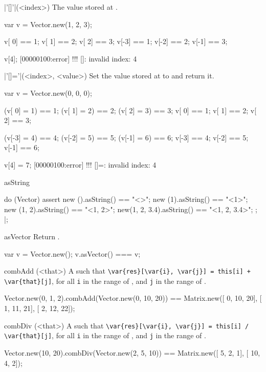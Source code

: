 \begin{urbiscriptapi}
\item|'[]'|(<index>)%
  The value stored at .
\begin{urbiassert}
var v = Vector.new(1, 2, 3);

v[ 0] == 1; v[ 1] == 2; v[ 2] == 3;
v[-3] == 1; v[-2] == 2; v[-1] == 3;

v[4];
[00000100:error] !!! []: invalid index: 4
\end{urbiassert}


\item|'[]='|(<index>, <value>)%
  Set the value stored at  to  and return it.
\begin{urbiassert}
var v = Vector.new(0, 0, 0);

(v[ 0] = 1) == 1; (v[ 1] = 2) == 2; (v[ 2] = 3) == 3;
 v[ 0]      == 1;  v[ 1]      == 2;  v[ 2]      == 3;

(v[-3] = 4) == 4; (v[-2] = 5) == 5; (v[-1] = 6) == 6;
 v[-3]      == 4;  v[-2]      == 5;  v[-1]      == 6;

v[4] = 7;
[00000100:error] !!! []=: invalid index: 4
\end{urbiassert}


\item[asString]%
\begin{urbiscript}
do (Vector)
{
  assert
  {
    new         ().asString() == "<>";
    new        (1).asString() == "<1>";
    new     (1, 2).asString() == "<1, 2>";
    new(1, 2, 3.4).asString() == "<1, 2, 3.4>";
  };
}|;
\end{urbiscript}


\item[asVector]%
  Return \this.
\begin{urbiassert}
var v = Vector.new();
v.asVector() === v;
\end{urbiassert}


\item[combAdd](<that>)%
  A   such that
  \lstinline|\var{res}[\var{i}, \var{j}] = this[i] + \var{that}[j]|, for all
  \lstinline|i| in the range of \this, and \lstinline|j| in the range of
  \that.
\begin{urbiassert}
Vector.new(0, 1, 2).combAdd(Vector.new(0, 10, 20))
  == Matrix.new([ 0, 10, 20],
                [ 1, 11, 21],
                [ 2, 12, 22]);
\end{urbiassert}


\item[combDiv](<that>)%
  A   such that
  \lstinline|\var{res}[\var{i}, \var{j}] = this[i] / \var{that}[j]|, for all
  \lstinline|i| in the range of \this, and \lstinline|j| in the range of
  \that.
\begin{urbiassert}
Vector.new(10, 20).combDiv(Vector.new(2, 5, 10))
  == Matrix.new([  5, 2, 1],
                [ 10, 4, 2]);
\end{urbiassert}



\end{urbiscriptapi}
